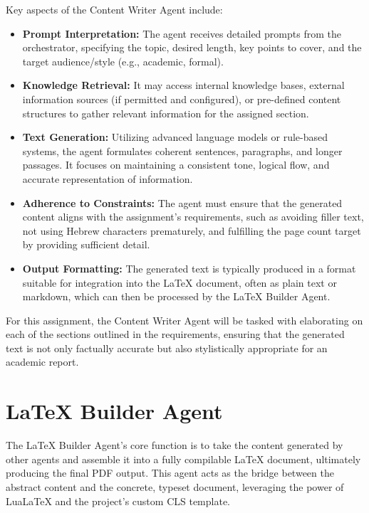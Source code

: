 \documentclass{custom-academic-template}
\begin{document}
Key aspects of the Content Writer Agent include:
\begin{itemize}
    \item 	\textbf{Prompt Interpretation:} The agent receives detailed prompts from the orchestrator, specifying the topic, desired length, key points to cover, and the target audience/style (e.g., academic, formal).
    \item 	\textbf{Knowledge Retrieval:} It may access internal knowledge bases, external information sources (if permitted and configured), or pre-defined content structures to gather relevant information for the assigned section.
    \item 	\textbf{Text Generation:} Utilizing advanced language models or rule-based systems, the agent formulates coherent sentences, paragraphs, and longer passages. It focuses on maintaining a consistent tone, logical flow, and accurate representation of information.
    \item 	\textbf{Adherence to Constraints:} The agent must ensure that the generated content aligns with the assignment's requirements, such as avoiding filler text, not using Hebrew characters prematurely, and fulfilling the page count target by providing sufficient detail.
    \item 	\textbf{Output Formatting:} The generated text is typically produced in a format suitable for integration into the LaTeX document, often as plain text or markdown, which can then be processed by the LaTeX Builder Agent.
\end{itemize}
For this assignment, the Content Writer Agent will be tasked with elaborating on each of the sections outlined in the requirements, ensuring that the generated text is not only factually accurate but also stylistically appropriate for an academic report.

\section{LaTeX Builder Agent}
The LaTeX Builder Agent's core function is to take the content generated by other agents and assemble it into a fully compilable LaTeX document, ultimately producing the final PDF output. This agent acts as the bridge between the abstract content and the concrete, typeset document, leveraging the power of LuaLaTeX and the project's custom CLS template.
\end{document}
